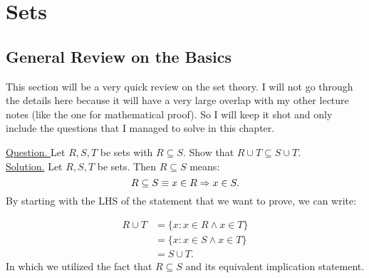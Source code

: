 \section{Sets}

\subsection{General Review on the Basics}

This section will be a very quick review on the set theory. I will not go through the details here because it will have a very large overlap with my other lecture notes (like the one for mathematical proof). So I will keep it shot and only include the questions that I managed to solve in this chapter.


\begin{example}{ }
	\underline{Question. }Let $ R,S,T $ be sets with $ R \subseteq S $. Show that $ R \cup T \subseteq S \cup T $.\\
	
	\underline{Solution.} Let $ R,S,T $ be sets. Then $ R \subseteq S $ means:
	\[ R \subseteq S \equiv x \in R \Rightarrow x \in S. \]
	By starting with the LHS of the statement that we want to prove, we can write:

	\begin{align*}
		R \cup T &= \{ x: x \in R \wedge x \in T \} \\
		&= \{x: x \in S \wedge x \in T \}  \\
		&= S \cup T.
	\end{align*}
	In which we utilized the fact that $ R \subseteq S $ and its equivalent implication statement. 


\end{example}

